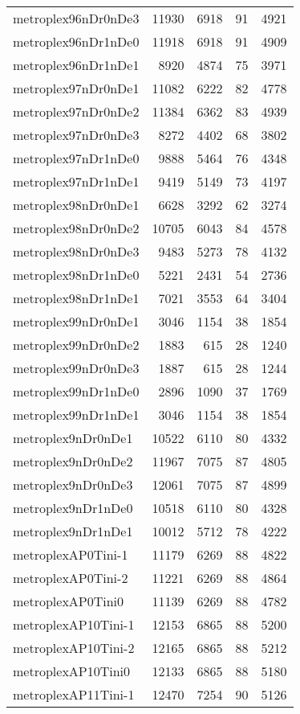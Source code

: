 \begin{longtable}{lrrrr}
metroplex96nDr0nDe3 & 11930 & 6918 & 91 & 4921 \\
metroplex96nDr1nDe0 & 11918 & 6918 & 91 & 4909 \\
metroplex96nDr1nDe1 & 8920 & 4874 & 75 & 3971 \\
metroplex97nDr0nDe1 & 11082 & 6222 & 82 & 4778 \\
metroplex97nDr0nDe2 & 11384 & 6362 & 83 & 4939 \\
metroplex97nDr0nDe3 & 8272 & 4402 & 68 & 3802 \\
metroplex97nDr1nDe0 & 9888 & 5464 & 76 & 4348 \\
metroplex97nDr1nDe1 & 9419 & 5149 & 73 & 4197 \\
metroplex98nDr0nDe1 & 6628 & 3292 & 62 & 3274 \\
metroplex98nDr0nDe2 & 10705 & 6043 & 84 & 4578 \\
metroplex98nDr0nDe3 & 9483 & 5273 & 78 & 4132 \\
metroplex98nDr1nDe0 & 5221 & 2431 & 54 & 2736 \\
metroplex98nDr1nDe1 & 7021 & 3553 & 64 & 3404 \\
metroplex99nDr0nDe1 & 3046 & 1154 & 38 & 1854 \\
metroplex99nDr0nDe2 & 1883 & 615 & 28 & 1240 \\
metroplex99nDr0nDe3 & 1887 & 615 & 28 & 1244 \\
metroplex99nDr1nDe0 & 2896 & 1090 & 37 & 1769 \\
metroplex99nDr1nDe1 & 3046 & 1154 & 38 & 1854 \\
metroplex9nDr0nDe1 & 10522 & 6110 & 80 & 4332 \\
metroplex9nDr0nDe2 & 11967 & 7075 & 87 & 4805 \\
metroplex9nDr0nDe3 & 12061 & 7075 & 87 & 4899 \\
metroplex9nDr1nDe0 & 10518 & 6110 & 80 & 4328 \\
metroplex9nDr1nDe1 & 10012 & 5712 & 78 & 4222 \\
metroplexAP0Tini-1 & 11179 & 6269 & 88 & 4822 \\
metroplexAP0Tini-2 & 11221 & 6269 & 88 & 4864 \\
metroplexAP0Tini0 & 11139 & 6269 & 88 & 4782 \\
metroplexAP10Tini-1 & 12153 & 6865 & 88 & 5200 \\
metroplexAP10Tini-2 & 12165 & 6865 & 88 & 5212 \\
metroplexAP10Tini0 & 12133 & 6865 & 88 & 5180 \\
metroplexAP11Tini-1 & 12470 & 7254 & 90 & 5126 \\

\end{longtable}
